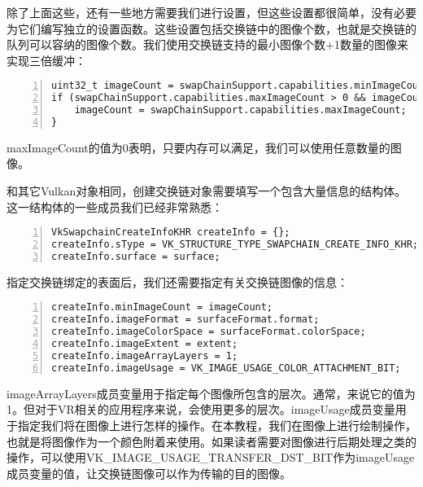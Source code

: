 \documentclass{ctexart}
\begin{document}
除了上面这些，还有一些地方需要我们进行设置，但这些设置都很简单，没有必要为它们编写独立的设置函数。这些设置包括交换链中的图像个数，也就是交换链的队列可以容纳的图像个数。我们使用交换链支持的最小图像个数+1数量的图像来实现三倍缓冲：

\begin{lstlisting}[language={[ANSI]C},keywordstyle=\color{blue!70},commentstyle=\color{red!50!green!50!blue!50},frame=shadowbox, rulesepcolor=\color{red!20!green!20!blue!20},basicstyle=\small,numbers=left, numberstyle=\tiny,breaklines=true]
uint32_t imageCount = swapChainSupport.capabilities.minImageCount + 1;
if (swapChainSupport.capabilities.maxImageCount > 0 && imageCount > swapChainSupport.capabilities.maxImageCount) {
	imageCount = swapChainSupport.capabilities.maxImageCount;
}
\end{lstlisting}

maxImageCount的值为0表明，只要内存可以满足，我们可以使用任意数量的图像。

和其它Vulkan对象相同，创建交换链对象需要填写一个包含大量信息的结构体。这一结构体的一些成员我们已经非常熟悉：

\begin{lstlisting}[language={[ANSI]C},keywordstyle=\color{blue!70},commentstyle=\color{red!50!green!50!blue!50},frame=shadowbox, rulesepcolor=\color{red!20!green!20!blue!20},basicstyle=\small,numbers=left, numberstyle=\tiny,breaklines=true]
VkSwapchainCreateInfoKHR createInfo = {};
createInfo.sType = VK_STRUCTURE_TYPE_SWAPCHAIN_CREATE_INFO_KHR;
createInfo.surface = surface;
\end{lstlisting}

指定交换链绑定的表面后，我们还需要指定有关交换链图像的信息：

\begin{lstlisting}[language={[ANSI]C},keywordstyle=\color{blue!70},commentstyle=\color{red!50!green!50!blue!50},frame=shadowbox, rulesepcolor=\color{red!20!green!20!blue!20},basicstyle=\small,numbers=left, numberstyle=\tiny,breaklines=true]
createInfo.minImageCount = imageCount;
createInfo.imageFormat = surfaceFormat.format;
createInfo.imageColorSpace = surfaceFormat.colorSpace;
createInfo.imageExtent = extent;
createInfo.imageArrayLayers = 1;
createInfo.imageUsage = VK_IMAGE_USAGE_COLOR_ATTACHMENT_BIT;
\end{lstlisting}

imageArrayLayers成员变量用于指定每个图像所包含的层次。通常，来说它的值为1。但对于VR相关的应用程序来说，会使用更多的层次。imageUsage成员变量用于指定我们将在图像上进行怎样的操作。在本教程，我们在图像上进行绘制操作，也就是将图像作为一个颜色附着来使用。如果读者需要对图像进行后期处理之类的操作，可以使用VK\_IMAGE\_USAGE\_TRANSFER\_DST\_BIT作为imageUsage成员变量的值，让交换链图像可以作为传输的目的图像。
\end{document}
